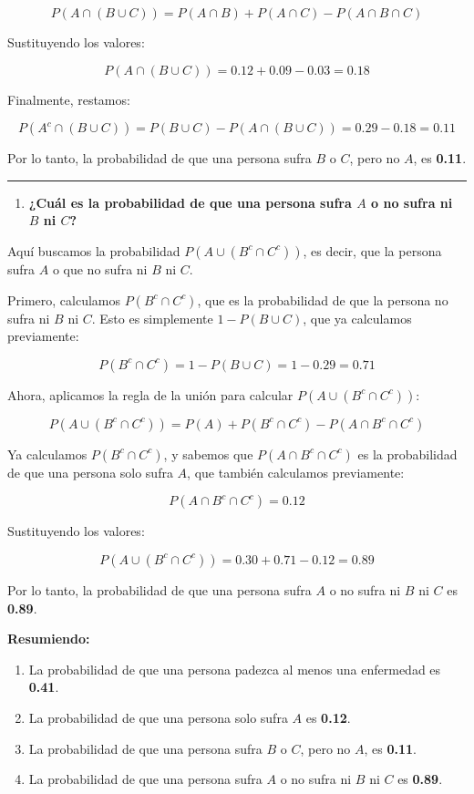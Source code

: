 \documentclass[
]{article}
\providecommand{\tightlist}{%
  \setlength{\itemsep}{0pt}\setlength{\parskip}{0pt}}
\begin{document}
\[
P(A \cap (B \cup C)) = P(A \cap B) + P(A \cap C) - P(A \cap B \cap C)
\]

Sustituyendo los valores:

\[
P(A \cap (B \cup C)) = 0.12 + 0.09 - 0.03 = 0.18
\]

Finalmente, restamos:

\[
P(A^c \cap (B \cup C)) = P(B \cup C) - P(A \cap (B \cup C)) = 0.29 - 0.18 = 0.11
\]

Por lo tanto, la probabilidad de que una persona sufra \(B\) o \(C\), pero no \(A\), es \textbf{0.11}.

\begin{center}\rule{0.5\linewidth}{0.5pt}\end{center}

\begin{enumerate}
\def\labelenumi{\alph{enumi})}
\setcounter{enumi}{3}
\tightlist
\item
  \textbf{¿Cuál es la probabilidad de que una persona sufra \(A\) o no sufra ni \(B\) ni \(C\)?}
\end{enumerate}

Aquí buscamos la probabilidad \(P(A \cup (B^c \cap C^c))\), es decir, que la persona sufra \(A\) o que no sufra ni \(B\) ni \(C\).

Primero, calculamos \(P(B^c \cap C^c)\), que es la probabilidad de que la persona no sufra ni \(B\) ni \(C\). Esto es simplemente \(1 - P(B \cup C)\), que ya calculamos previamente:

\[
P(B^c \cap C^c) = 1 - P(B \cup C) = 1 - 0.29 = 0.71
\]

Ahora, aplicamos la regla de la unión para calcular \(P(A \cup (B^c \cap C^c))\):

\[
P(A \cup (B^c \cap C^c)) = P(A) + P(B^c \cap C^c) - P(A \cap B^c \cap C^c)
\]

Ya calculamos \(P(B^c \cap C^c)\), y sabemos que \(P(A \cap B^c \cap C^c)\) es la probabilidad de que una persona solo sufra \(A\), que también calculamos previamente:

\[
P(A \cap B^c \cap C^c) = 0.12
\]

Sustituyendo los valores:

\[
P(A \cup (B^c \cap C^c)) = 0.30 + 0.71 - 0.12 = 0.89
\]

Por lo tanto, la probabilidad de que una persona sufra \(A\) o no sufra ni \(B\) ni \(C\) es \textbf{0.89}.

\textbf{Resumiendo:}

\begin{enumerate}
\def\labelenumi{\arabic{enumi}.}
\tightlist
\item
  La probabilidad de que una persona padezca al menos una enfermedad es \textbf{0.41}.
\item
  La probabilidad de que una persona solo sufra \(A\) es \textbf{0.12}.
\item
  La probabilidad de que una persona sufra \(B\) o \(C\), pero no \(A\), es \textbf{0.11}.
\item
  La probabilidad de que una persona sufra \(A\) o no sufra ni \(B\) ni \(C\) es \textbf{0.89}.
\end{enumerate}
\end{document}

